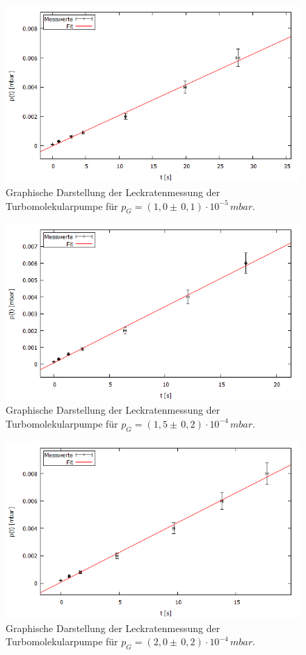 \begin{figure}[H]
  \centering
  \includegraphics[width=14cm]{bilder/leckratefit2.png}
	\caption{Graphische Darstellung der Leckratenmessung der Turbomolekularpumpe für $p_G=(1,0 \pm \, 0,1)\cdot 10^{-5} \, \si{mbar}$.}
  \label{leckrate2}
\end{figure}
\begin{figure}[H]
  \centering
  \includegraphics[width=14cm]{bilder/leckratefit3.png}
	\caption{Graphische Darstellung der Leckratenmessung der Turbomolekularpumpe für $p_G=(1,5 \pm \, 0,2)\cdot 10^{-4} \, \si{mbar}$.}
  \label{leckrate3}
\end{figure}
\begin{figure}[H]
  \centering
  \includegraphics[width=14cm]{bilder/leckratefit4.png}
	\caption{Graphische Darstellung der Leckratenmessung der Turbomolekularpumpe für $p_G=(2,0 \pm \, 0,2)\cdot 10^{-4} \, \si{mbar}$.}
  \label{leckrate4}
\end{figure}
